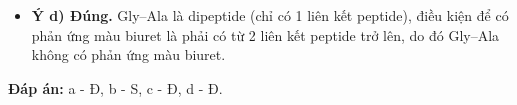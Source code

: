 \documentclass[12pt,a4paper]{article}
\begin{document}
\begin{ex}
{\begin{itemize}
	$\Rightarrow 2{,}17 + 40 \times 3 n_X = 3{,}19 + 18 n_X \Rightarrow 102 n_X = 1{,}02 \Rightarrow n_X = 0{,}01\text{ mol}$.\\
	Khối lượng mol của X: $M_X = \dfrac{2{,}17}{0{,}01} = 217\text{ g/mol}$.\\
	- Phản ứng với HCl:\\
	Khi lấy $3{,}255\text{ gam}$ X thì $n_{X} = \dfrac{3{,}255}{217} = 0{,}015\text{ mol}$.\\
	$\ce{X + 2 H2O + 3 HCl -> Muối}$\\
	Khối lượng muối thu được:\\
	$m_{\text{muối}} = m_X + m_{\ce{H2O}} + m_{\ce{HCl}} = 3{,}255 + (2 \times 0{,}015 \times 18) + (3 \times 0{,}015 \times 36{,}5) = 5{,}4375\text{ gam}$.\\
	Giá trị hoàn toàn khớp với đề bài.
	\item \textbf{Ý d) Đúng.} Gly--Ala là dipeptide (chỉ có 1 liên kết peptide), điều kiện để có phản ứng màu biuret là phải có từ 2 liên kết peptide trở lên, do đó Gly--Ala không có phản ứng màu biuret.
\end{itemize}
\textbf{Đáp án:} a - Đ, b - S, c - Đ, d - Đ.
}
\end{ex}
\end{document}
